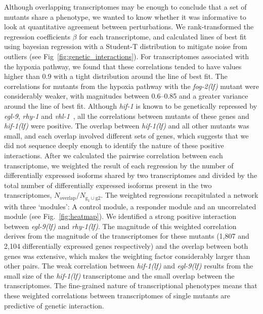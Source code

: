 \documentclass[9pt,twocolumn,twoside]{pnas-new}
\newcommand{\gene}[1]{\emph{#1}}
\newcommand{\fog}{\emph{fog-2(lf)}}
\newcommand{\egl}{\emph{egl-9(lf)}}
\newcommand{\rhy}{\emph{rhy-1(lf)}}
\newcommand{\vhl}{\emph{vhl-1(lf)}}
\newcommand{\hif}{\emph{hif-1(lf)}}
\newcommand{\egln}{1,807}
\newcommand{\rhyn}{2,104}
\begin{document}
Although overlapping transcriptomes may be enough to conclude that a set of mutants
share a phenotype, we wanted to know whether it was informative to
look at quantitative agreement between perturbations. We rank-transformed
the regression coefficients $\beta$ for each transcriptome, and calculated lines
of best fit using bayesian regression with a Student-T distribution to mitigate
noise from outliers (see Fig~\ref{fig:genetic_interactions}). For transcriptomes
associated with the hypoxia pathway, we found that these correlations tended to have
values higher than 0.9 with a tight distribution around the line of best fit.
The correlations for mutants from the hypoxia pathway
with the \fog{} mutant were considerably weaker, with magnitudes between
0.6--0.85 and a greater variance around the line of best fit.
Although \gene{hif-1} is known to be genetically repressed by \gene{egl-9}, \gene{rhy-1} and
\gene{vhl-1}~\cite{Epstein2001,Shen2006}, all the correlations
between mutants of these genes and \hif{} were positive. The overlap between
\hif{} and all other mutants was small, and each overlap involved
different sets of genes, which suggests that we did not sequence deeply enough
to identify the nature of these positive interactions.
After we calculated the pairwise correlation between each transcriptome,
we weighted the result of each regression by the
number of differentially expressed isoforms shared by two transcriptomes and
divided by the total number of differentially expressed isoforms present in the
two transcriptomes, $N_\mathrm{overlap}/N_{\mathrm{g_1} \cup \mathrm{g2}}$.
The weighted regressions recapitulated a network with three `modules': A control
module, a responder module and an uncorrelated module (see Fig.~\ref{fig:heatmap}).
We identified a strong positive interaction between \egl{} and \rhy{}.
The magnitude of this weighted correlation derives from the magnitude of the
transcriptomes for these mutants (\egln{} and \rhyn{} differentially expressed
genes respectively) and the overlap between both genes was
extensive, which makes the weighting factor considerably larger than other pairs.
The weak correlation between \hif{} and \egl{} results from the small size of
the \hif{} transcriptome and the small overlap between the transcriptomes.
The fine-grained nature of transcriptional phenotypes means that these weighted
correlations between transcriptomes of single mutants are predictive of genetic
interaction.
\end{document}
